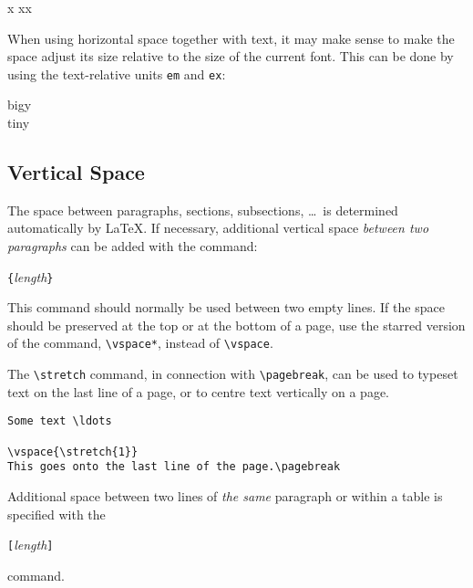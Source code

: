 \begin{example}
x
xx
\end{example}

When using horizontal space together with text, it may make sense to make
the space adjust its size relative to the size of the current font.
This can be done by using the text-relative units \texttt{em} and
\texttt{ex}:

\begin{example}
{\Large{}big\hspace{1em}y}\\
{\tiny{}tin\hspace{1em}y}
\end{example}

\subsection{Vertical Space}
The space between paragraphs, sections, subsections, \ldots\ is
determined automatically by \LaTeX. If necessary, additional vertical
space \emph{between two paragraphs} can be added with the command:
\begin{lscommand}
\verb|{|\emph{length}\verb|}|
\end{lscommand}

This command should normally be used between two empty lines.  If the
space should be preserved at the top or at the bottom of a page, use
the starred version of the command, \verb|\vspace*|, instead of \verb|\vspace|.

The \verb|\stretch| command, in connection with \verb|\pagebreak|, can
be used to typeset text on the last line of a page, or to centre text
vertically on a page.
\begin{code}
\begin{verbatim}
Some text \ldots

\vspace{\stretch{1}}
This goes onto the last line of the page.\pagebreak
\end{verbatim}
\end{code}

Additional space between two lines of \emph{the same} paragraph or
within a table is specified with the
\begin{lscommand}
\ci{\bs}\verb|[|\emph{length}\verb|]|
\end{lscommand}
\noindent command.

